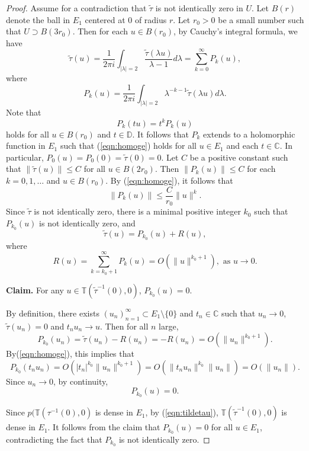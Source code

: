 \documentclass{amsart}
\numberwithin{equation}{section}
\newcommand{\C}{\mathbb C}
\theoremstyle{definition}
\theoremstyle{remark}
\begin{document}
\begin{proof}
Assume for a contradiction that $\widetilde{\tau}$ is not identically zero in $U$. Let $B(r)$ denote the ball in $E_1$ centered at $0$ of radius $r$. Let $r_0>0$ be a small number such that $U\supset B(3 r_0).$ Then for each $u\in B(r_0)$, by Cauchy's integral formula, we have 
$$\widetilde{\tau}(u)=\frac{1}{2\pi i} \int_{|\lambda|=2} \frac{\widetilde{\tau}(\lambda u)}{\lambda-1} d\lambda=\sum_{k=0}^\infty P_k(u),$$  
where 
$$P_k(u)=\frac{1}{2\pi i} \int_{|\lambda|=2} \lambda^{-k-1} \widetilde{\tau}(\lambda u) d\lambda.$$ 
Note that 
\begin{equation}\label{eqn:homoge}
P_k(tu)=t^k P_k(u)
\end{equation}
holds for all $u\in B(r_0)$ and $t\in \mathbb{D}$. It follows that $P_k$ extends to a holomorphic function in $E_1$ such that (\ref{eqn:homoge}) holds for all $u\in E_1$ and each $t\in \C$. In particular, $P_0(u)=P_0(0)=\widetilde{\tau}(0)=0$. Let $C$ be a positive constant such that $\|\widetilde{\tau}(u)\|\le C$ for all $u\in B(2r_0)$. Then $\|P_k(u)\|\le C$ for each $k=0,1,\ldots$ and $u\in B(r_0)$. By (\ref{eqn:homoge}), it follows that 
$$\|P_k(u)\|\le \frac{C}{r_0}\|u\|^k.$$
Since $\widetilde{\tau}$ is not identically zero, there is a minimal positive integer $k_0$ such that $P_{k_0}(u)$ is not identically zero, and $$\widetilde{\tau}(u)=P_{k_0}(u)+R(u),$$
where $$R(u)=\sum_{k=k_0+1}^\infty P_k(u)=O(\|u\|^{k_0+1}), \mbox{ as } u\to 0.$$





{\bf Claim.} For any $u\in \mathbb{T}(\widetilde{\tau}^{-1}(0),0)$, $P_{k_0}(u)=0$.

By definition, there exists $(u_n)_{n=1}^\infty \subset E_1\setminus \{0\}$ and $t_n\in \C$ such that $u_n\to 0$, $\widetilde{\tau}(u_n)=0$ and $t_n u_n\to u$. 
Then for all $n$ large, $$P_{k_0}(u_n)=\widetilde{\tau}(u_n)-R(u_n)=-R(u_n)=O(\|u_n\|^{k_0+1}).$$
By(\ref{eqn:homoge}), this implies that  
$$P_{k_0}\left(t_nu_n\right)=O(|t_n|^{k_0}\|u_n\|^{k_0+1})=O(\|t_nu_n\|^{k_0} \|u_n\|)=O(\|u_n\|).$$
Since $u_n\to 0$, by continuity,
$$P_{k_0}\left(u\right)=0.$$


Since $p(\mathbb{T}(\tau^{-1}(0),0)$ is dense in $E_1$, by (\ref{eqn:tildetau}), $\mathbb{T}(\widetilde{\tau}^{-1}(0),0)$ is dense in $E_1$. It follows from the claim that $P_{k_0}(u)=0$ for all $u\in E_1$, contradicting the fact that $P_{k_0}$ is not identically zero. 
\end{proof}
\end{document}
